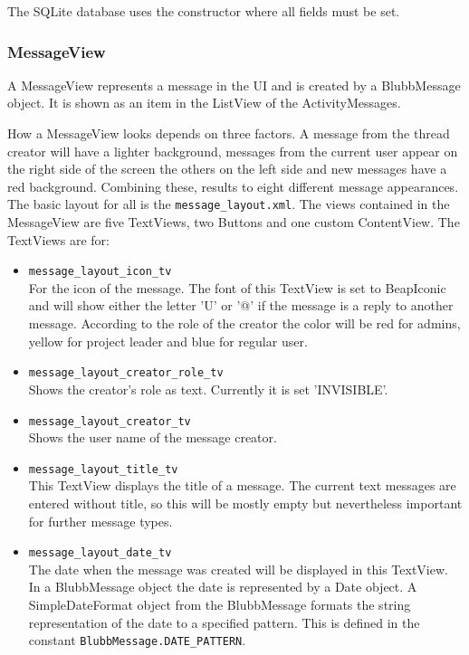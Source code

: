 \documentclass[12pt,a4paper,oneside]{report}
\newcommand{\code}[1]{\lstinline{#1}}
\begin{document}
The SQLite database uses the constructor where all fields must be set. 

\subsubsection{MessageView}
A MessageView represents a message in the UI and is created by a BlubbMessage object. It is shown as an item in the ListView of the ActivityMessages.

How a MessageView looks depends on three factors. A message from the thread creator will have a lighter background, messages from the current user appear on the right side of the screen the others on the left side and new messages have a red background. Combining these, results to eight different message appearances.
The basic layout for all is the \code{message_layout.xml}. The views contained in the MessageView are five TextViews, two Buttons and one custom ContentView.
The TextViews are for:
\begin{itemize}
\item \code{message_layout_icon_tv}\\
For the icon of the message. The font of this TextView is set to BeapIconic and will show either the letter 'U' or '@' if the message is a reply to another message. According to the role of the creator the color will be red for admins, yellow for project leader and blue for regular user.

\item \code{message_layout_creator_role_tv}\\
Shows the creator's role as text. Currently it is set 'INVISIBLE'.

\item \code{message_layout_creator_tv}\\
Shows the user name of the message creator.

\item \code{message_layout_title_tv}\\
This TextView displays the title of a message. The current text messages are entered without title, so this will be mostly empty but nevertheless important for further message types.

\item \code{message_layout_date_tv}\\
The date when the message was created will be displayed in this TextView. In a BlubbMessage object the date is represented by a Date object. A SimpleDateFormat object from the BlubbMessage formats the string representation of the date to a specified pattern. This is defined in the constant \code{BlubbMessage.DATE_PATTERN}.

\end{itemize}
\end{document}
